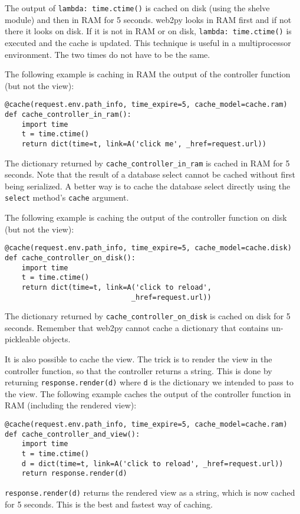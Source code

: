 \documentclass[justified,sixbynine,notoc]{tufte-book}
\def\ft{\small\tt}
\def\inxx#1{\index{#1}}
\begin{document}
\begin{fullwidth}
The output of {\ft lambda: time.ctime()} is cached on disk (using the shelve module) and then in RAM for 5 seconds. web2py looks in RAM first and if not there it looks on disk. If it is not in RAM or on disk, {\ft lambda: time.ctime()} is executed and the cache is updated. This technique is useful in a multiprocessor environment. The two times do not have to be the same.

The following example is caching in RAM the output of the controller function (but not the view):

\inxx{cache controller}
\begin{lstlisting}
@cache(request.env.path_info, time_expire=5, cache_model=cache.ram)
def cache_controller_in_ram():
    import time
    t = time.ctime()
    return dict(time=t, link=A('click me', _href=request.url))
\end{lstlisting}

The dictionary returned by {\ft cache\_controller\_in\_ram} is cached in RAM for 5 seconds. Note that the result of a database select cannot be cached without first being serialized. A better way is to cache the database select directly using the {\ft select} method's {\ft cache} argument.

The following example is caching the output of the controller function on disk (but not the view):
\begin{lstlisting}
@cache(request.env.path_info, time_expire=5, cache_model=cache.disk)
def cache_controller_on_disk():
    import time
    t = time.ctime()
    return dict(time=t, link=A('click to reload',
                              _href=request.url))
\end{lstlisting}

The dictionary returned by {\ft cache\_controller\_on\_disk}  is cached on disk for 5 seconds. Remember that web2py cannot cache a dictionary that contains un-pickleable objects.

It is also possible to cache the view. The trick is to render the view in the controller function, so that the controller returns a string. This is done by returning {\ft response.render(d)} where {\ft d} is the dictionary we intended to pass to the view. The following example caches the output of the controller function in RAM (including the rendered view):

\inxx{cache view}
\begin{lstlisting}
@cache(request.env.path_info, time_expire=5, cache_model=cache.ram)
def cache_controller_and_view():
    import time
    t = time.ctime()
    d = dict(time=t, link=A('click to reload', _href=request.url))
    return response.render(d)
\end{lstlisting}
{\ft response.render(d)} returns the rendered view as a string, which is now cached for 5 seconds. This is the best and fastest way of caching.


\end{fullwidth}
\end{document}
